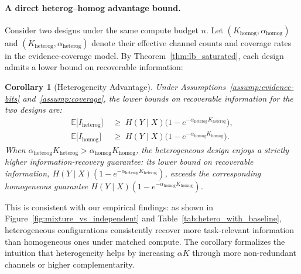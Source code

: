 \documentclass{article}
\theoremstyle{plain}
\newtheorem{corollary}[theorem]{Corollary}
\theoremstyle{definition}
\theoremstyle{remark}
\newcommand{\EE}{\mathbb{E}}
\begin{document}
\paragraph{A direct heterog--homog advantage bound.}
Consider two designs under the same compute budget $n$.
Let $(K_{\mathrm{homog}},\alpha_{\mathrm{homog}})$ and $(K_{\mathrm{heterog}},\alpha_{\mathrm{heterog}})$ denote their effective channel counts and coverage rates in the evidence-coverage model.
By Theorem~\ref{thm:lb_saturated}, each design admits a lower bound on recoverable information:
\begin{corollary}[Heterogeneity Advantage]
\label{cor:heterog_homog_gap_B}
Under Assumptions~\ref{assump:evidence-bits} and~\ref{assump:coverage}, the lower bounds on recoverable information for the two designs are:
\begin{align}
\EE\big[I_{\mathrm{heterog}}\big] &\;\ge\; H(Y\mid X)\big(1-e^{-\alpha_{\mathrm{heterog}}K_{\mathrm{heterog}}}\big), \label{eq:lb_heterog}\\
\EE\big[I_{\mathrm{homog}}\big] &\;\ge\; H(Y\mid X)\big(1-e^{-\alpha_{\mathrm{homog}}K_{\mathrm{homog}}}\big). \label{eq:lb_homog}
\end{align}
When $\alpha_{\mathrm{heterog}}K_{\mathrm{heterog}}>\alpha_{\mathrm{homog}}K_{\mathrm{homog}}$, the heterogeneous design enjoys a strictly higher information-recovery guarantee: its lower bound on recoverable information, $H(Y\mid X)(1-e^{-\alpha_{\mathrm{heterog}}K_{\mathrm{heterog}}})$, exceeds the corresponding homogeneous guarantee $H(Y\mid X)(1-e^{-\alpha_{\mathrm{homog}}K_{\mathrm{homog}}})$.
\end{corollary}
\noindent This is consistent with our empirical findings: as shown in Figure~\ref{fig:mixture_vs_independent} and Table~\ref{tab:hetero_with_baseline}, heterogeneous configurations consistently recover more task-relevant information than homogeneous ones under matched compute.
The corollary formalizes the intuition that heterogeneity helps by increasing $\alpha K$ through more non-redundant channels or higher complementarity.
\end{document}
